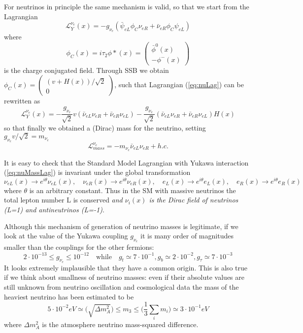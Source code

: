 \documentclass{subnucbo}
\begin{document}
For neutrinos in principle the same mechanism is valid, so that we start from the Lagrangian
\begin{equation}
\label{eq:nuLag}
\mathcal{L}_Y^{\nu_e}(x)=-g_{\nu_e}(\bar{\psi}_{eL}\phi_C \nu_{eR}+\bar{\nu}_{eR}\phi_C \psi_{eL})
\end{equation}
where
\begin{equation}
\phi_C(x)=i\tau_2\phi*(x)=\begin{pmatrix}\bar{\phi}^0(x) \\ -\phi^-(x)\end{pmatrix}
\end{equation}
is the charge conjugated field. Through SSB we obtain $\phi_C(x)=\begin{pmatrix}(v+H(x))/\sqrt{2}\\0\end{pmatrix}$, such that Lagrangian (\ref{eq:nuLag}) can be rewritten as
\begin{equation}
\label{eq:nuMassLag}
\mathcal{L}_Y^{\nu_e}(x)=-\frac{g_{\nu_e}}{\sqrt{2}}v(\bar{\nu}_{eL}\nu_{eR}+\bar{\nu}_{eR}\nu_{eL})-\frac{g_{\nu_e}}{\sqrt{2}}(\bar{\nu}_{eL}\nu_{eR}+\bar{\nu}_{eR}\nu_{eL})H(x)
\end{equation}
so that finally we obtained a (Dirac) mass for the neutrino, setting $g_{\nu_e}v/\sqrt{2}=m_{\nu_e}$
\begin{equation}
\mathcal{L}_{mass}^{\nu_e}=-m_{\nu_e}\bar{\nu}_{eL}\nu_{eR}+h.c.
\end{equation}

It is easy to check that the Standard Model Lagrangian with Yukawa interaction (\ref{eq:nuMassLag}) is invariant under the global transformation
\[
\nu_{eL}(x)\rightarrow e^{i\theta}\nu_{eL}(x),\quad\nu_{eR}(x)\rightarrow e^{i\theta}\nu_{eR}(x),
\quad e_L(x)\rightarrow e^{i\theta}e_L(x),\quad e_R(x)\rightarrow e^{i\theta}e_R(x)
\]
where $\theta$ is an arbitrary constant. Thus in the SM with massive neutrinos the total lepton number L is conserved  \emph{and $\nu_i(x)$ is the Dirac field of neutrinos (L=1) and antineutrinos (L=-1)}.

Although this mechanism of generation of neutrino masses is legitimate, if we look at the value of the Yukawa coupling $g_{\nu_e}$ it is many order of magnitudes smaller than the couplings for the other fermions:%
\[
2\cdot10^{-13}\leq g_{\nu_e}\leq10^{-12} \quad \text{while}\quad g_t\simeq7\cdot10^{-1}, g_b\simeq2\cdot10^{-2}, g_{\tau}\simeq7\cdot10^{-3}
\]
It looks extremely implausible that they have a common origin. This is also true if we think about smallness of neutrino masses: even if their absolute values are still unknown from neutrino oscillation and cosmological data the mass of the heaviest neutrino has been estimated to be
\[
5\cdot10^{-2}eV\simeq\biggl(\sqrt{\Delta m^2_A}\biggr)\leq m_3\leq\biggl(\frac{1}{3}\sum_im_i\biggr)\simeq3\cdot10^{-1}eV
\]
where $\Delta m^2_A$ is the atmosphere neutrino mass-squared difference.
\end{document}
